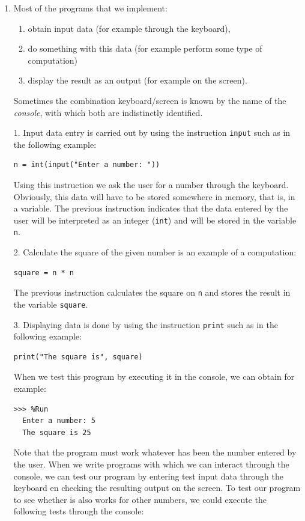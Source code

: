 \documentclass[
  fontsize=10pt,
  a4paper,
]{scrartcl}
\begin{document}
\begin{enumerate}

\item Most of the programs that we implement:
\begin{enumerate}
\item obtain input data (for example through the keyboard),
\item do something with this data (for example perform some type of computation)
\item display the result as an output (for example on the screen).
\end{enumerate}

Sometimes the combination keyboard/screen is known by the name of the {\em console}, with which both are indistinctly identified.


1. Input data entry is carried out by using the instruction 
\verb+input+ such as in the following example:
\begin{Verbatim}[frame=single]
     n = int(input("Enter a number: "))
\end{Verbatim}
Using this instruction we ask the user for a number through the keyboard. Obviously, this data will have to be stored somewhere in memory, that is, in a variable. The previous instruction indicates that the data entered by the user will be interpreted as an integer (\verb+int+) and will be stored in the variable \verb+n+.


2. Calculate the square of the given number is an example of a computation:

\begin{Verbatim}[frame=single]
     square = n * n
\end{Verbatim}
The previous instruction calculates the square on \verb+n+ and stores the result in the variable \verb+square+.

3. Displaying data is done by using the instruction 
\verb+print+ such as in the following example:

\begin{Verbatim}[frame=single]
     print("The square is", square)
\end{Verbatim}

When we test this program by executing it in the console, we can obtain for example:
\begin{Verbatim}[frame=single, label={\em example test execution of the program}]
>>> %Run 
  Enter a number: 5
  The square is 25
\end{Verbatim}
Note that the program must work whatever has been the number entered by the user. When we write programs with which we can interact through the console, we can test our program by entering test input data through the keyboard en checking the resulting output on the screen.
To test our program to see whether is also works for other numbers, we could execute the following tests through the console:


\end{enumerate}
\end{document}
